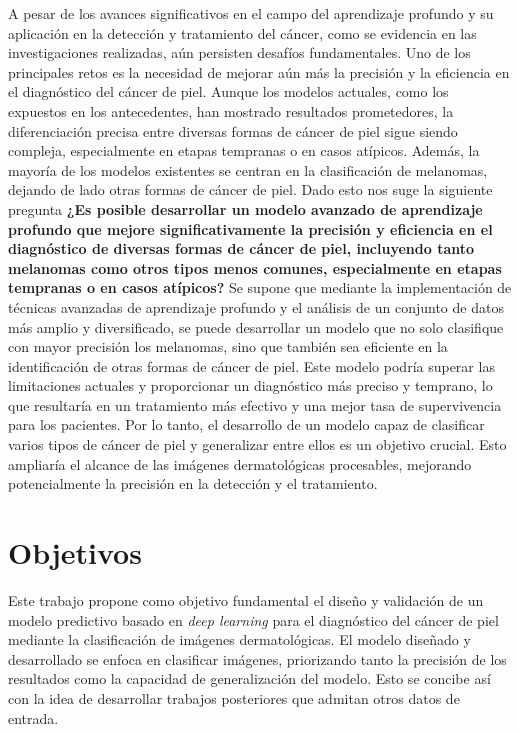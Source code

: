 A pesar de los avances significativos en el campo del aprendizaje profundo y su aplicación en la detección y tratamiento del cáncer, como se evidencia en las investigaciones realizadas, aún persisten desafíos fundamentales. Uno de los principales retos es la necesidad de mejorar aún más la precisión y la eficiencia en el diagnóstico del cáncer de piel. Aunque los modelos actuales, como los expuestos en los antecedentes, han mostrado resultados prometedores, la diferenciación precisa entre diversas formas de cáncer de piel sigue siendo compleja, especialmente en etapas tempranas o en casos atípicos. Además, la mayoría de los modelos existentes se centran en la clasificación de melanomas, dejando de lado otras formas de cáncer de piel. Dado esto nos suge la siguiente pregunta \textbf{¿Es posible desarrollar un modelo avanzado de aprendizaje profundo que mejore significativamente la precisión y eficiencia en el diagnóstico de diversas formas de cáncer de piel, incluyendo tanto melanomas como otros tipos menos comunes, especialmente en etapas tempranas o en casos atípicos?} Se supone que mediante la implementación de técnicas avanzadas de aprendizaje profundo y el análisis de un conjunto de datos más amplio y diversificado, se puede desarrollar un modelo que no solo clasifique con mayor precisión los melanomas, sino que también sea eficiente en la identificación de otras formas de cáncer de piel. Este modelo podría superar las limitaciones actuales y proporcionar un diagnóstico más preciso y temprano, lo que resultaría en un tratamiento más efectivo y una mejor tasa de supervivencia para los pacientes. Por lo tanto, el desarrollo de un modelo capaz de clasificar varios tipos de cáncer de piel y generalizar entre ellos es un objetivo crucial. Esto ampliaría el alcance de las imágenes dermatológicas procesables, mejorando potencialmente la precisión en la detección y el tratamiento.

\section*{Objetivos}

Este trabajo propone como objetivo fundamental el diseño y validación de un modelo predictivo basado en \textit{deep learning} para el diagnóstico del cáncer de piel mediante la clasificación de imágenes dermatológicas. El modelo diseñado y desarrollado se enfoca en clasificar imágenes, priorizando tanto la precisión de los resultados como la capacidad de generalización del modelo. Esto se concibe así con la idea de desarrollar trabajos posteriores que admitan otros datos de entrada.

